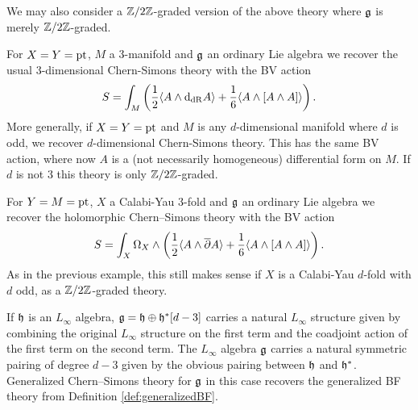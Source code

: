 \documentclass[10pt, oneside]{article}
\begin{document}
We may also consider a $\mathbb Z/2\mathbb Z$-graded version of the above theory where $\mathfrak g$ is merely $\mathbb Z/2\mathbb Z$-graded.

\begin{example}
For $X=Y=\operatorname{pt}$, $M$ a 3-manifold and $\mathfrak g$ an ordinary Lie algebra we recover the usual 3-dimensional Chern-Simons theory with the BV action
\[S = \int_M \left(\frac{1}{2}\langle A\wedge {\rm d}_{\mathrm{dR}} A\rangle + \frac{1}{6}\langle A\wedge [A\wedge A]\rangle\right).\]
More generally, if $X=Y=\operatorname{pt}$ and $M$ is any $d$-dimensional manifold where $d$ is odd, we recover $d$-dimensional Chern-Simons theory.  This has the same BV action, where now $A$ is a (not necessarily homogeneous) differential form on $M$.  If $d$ is not 3 this theory is only $\mathbb Z/2\mathbb Z$-graded.
\end{example}

\begin{example}
For $Y=M=\operatorname{pt}$, $X$ a Calabi-Yau 3-fold and $\mathfrak g$ an ordinary Lie algebra we recover the holomorphic Chern--Simons theory with the BV action
\[S = \int_X \Omega_X\wedge \left(\frac{1}{2}\langle A\wedge \overline{\partial} A\rangle + \frac{1}{6}\langle A\wedge [A\wedge A]\rangle\right).\]
As in the previous example, this still makes sense if $X$ is a Calabi-Yau $d$-fold with $d$ odd, as a $\mathbb Z/2\mathbb Z$-graded theory.
\end{example}

\begin{example}
If $\mathfrak h$ is an $L_\infty$ algebra, $\mathfrak g = \mathfrak h \oplus \mathfrak h^*[d-3]$ carries a natural $L_\infty$ structure given by combining the original $L_\infty$ structure on the first term and the coadjoint action of the first term on the second term. The $L_\infty$ algebra $\mathfrak g$ carries a natural symmetric pairing of degree $d-3$ given by the obvious pairing between $\mathfrak h$ and $\mathfrak h^*$. Generalized Chern--Simons theory for $\mathfrak g$ in this case recovers the generalized BF theory from Definition \ref{def:generalizedBF}.
\label{ex:CSBF}
\end{example}
\end{document}
